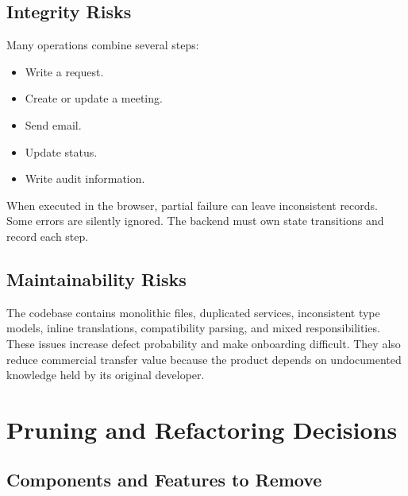 \documentclass[11pt,a4paper,oneside]{report}
\begin{document}
\section{Integrity Risks}

Many operations combine several steps:

\begin{itemize}
  \item Write a request.
  \item Create or update a meeting.
  \item Send email.
  \item Update status.
  \item Write audit information.
\end{itemize}

When executed in the browser, partial failure can leave inconsistent records. Some errors are silently ignored. The backend must own state transitions and record each step.

\section{Maintainability Risks}

The codebase contains monolithic files, duplicated services, inconsistent type models, inline translations, compatibility parsing, and mixed responsibilities. These issues increase defect probability and make onboarding difficult. They also reduce commercial transfer value because the product depends on undocumented knowledge held by its original developer.

\chapter{Pruning and Refactoring Decisions}

\section{Components and Features to Remove}
\end{document}
